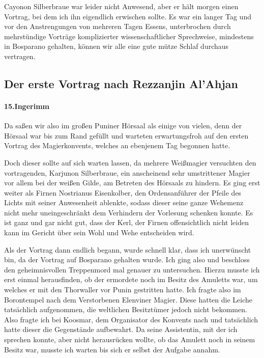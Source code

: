 Cayonon Silberbraue war leider nicht Anwesend, aber er hält morgen einen Vortrag, bei dem ich ihn eigendlich erwischen sollte.
Es war ein langer Tag und vor den Anstrengungen von mehreren Tagen Essens, unterbrochen durch mehrstündige Vorträge komplizierter wissenschaftlicher Sprechweise, mindestens in Bosparano gehalten, können wir alle eine gute mütze Schlaf durchaus vertragen.

\subsection{Der erste Vortrag nach Rezzanjin Al'Ahjan}

\paragraph{15.Ingerimm}
Da saßen wir also im großen Puniner Hörsaal als einige von vielen, denn der Hörsaal war bis zum Rand gefüllt und warteten erwartungsfroh auf den ersten Vortrag des Magierkonvents, welches an ebenjenem Tag begonnen hatte.

Doch dieser sollte auf sich warten lassen, da mehrere Weißmagier versuchten den vortragenden, Karjunon Silberbraue, ein anscheinend sehr umstrittener Magier vor allem bei der weißen Gilde, am Betreten des Hörsaals zu hindern. Es ging erst weiter als Firnen Nostrianus Eisenkolber, den Ordensanführer der Pfeile des Lichts mit seiner Anwesenheit ablenkte, sodass dieser seine ganze Wehemenz nicht mehr uneingeschränkt dem Verhindern der Vorlesung schenken konnte. Es ist ganz und gar nicht gut, dass der Kerl, der Firnen offensichtlich nicht leiden kann im Gericht über sein Wohl und Wehe entscheiden wird.

Als der Vortrag dann endlich begann, wurde schnell klar, dass ich unerwünscht bin, da der Vortrag auf Bosparano gehalten wurde. Ich ging also und beschloss den geheimnisvollen Treppenmord mal genauer zu untersuchen. Hierzu musste ich erst einmal herausfinden, ob der ermordete noch im Besitz des Amuletts war, um welches er mit den Thorwaller vor Punin gestritten hatte. Ich fragte also im Borontempel nach dem Verstorbenen Elenviner Magier. Diese hatten die Leiche tatsächlich aufgenommen, die weltlichen Besitztümer jedoch nicht bekommen. Also fragte ich bei Koosmar, dem Organisator des Konvents nach und tatsächlich hatte dieser die Gegenstände aufbewahrt. Da seine Assistentin, mit der ich sprechen konnte, aber nicht herausrücken wollte, ob das Amulett noch in seinem Besitz war, musste ich warten bis sich er selbst der Aufgabe annahm.

